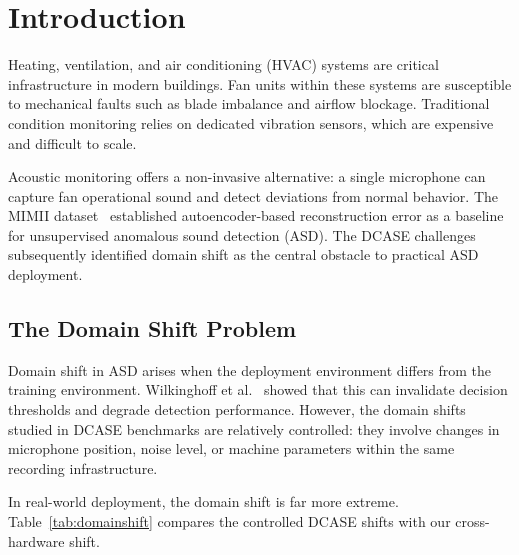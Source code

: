 \documentclass[sigconf]{acmart}
\begin{document}

\maketitle

\section{Introduction}

Heating, ventilation, and air conditioning (HVAC) systems are critical infrastructure in modern buildings. Fan units within these systems are susceptible to mechanical faults such as blade imbalance and airflow blockage. Traditional condition monitoring relies on dedicated vibration sensors, which are expensive and difficult to scale.

Acoustic monitoring offers a non-invasive alternative: a single microphone can capture fan operational sound and detect deviations from normal behavior. The MIMII dataset~\cite{purohit2019mimii} established autoencoder-based reconstruction error as a baseline for unsupervised anomalous sound detection (ASD). The DCASE challenges~\cite{wilkinghoff2025domainshift} subsequently identified domain shift as the central obstacle to practical ASD deployment.

\subsection{The Domain Shift Problem}

Domain shift in ASD arises when the deployment environment differs from the training environment. Wilkinghoff et al.~\cite{wilkinghoff2025domainshift} showed that this can invalidate decision thresholds and degrade detection performance. However, the domain shifts studied in DCASE benchmarks are relatively controlled: they involve changes in microphone position, noise level, or machine parameters within the same recording infrastructure.

In real-world deployment, the domain shift is far more extreme. Table~\ref{tab:domainshift} compares the controlled DCASE shifts with our cross-hardware shift.
\end{document}
